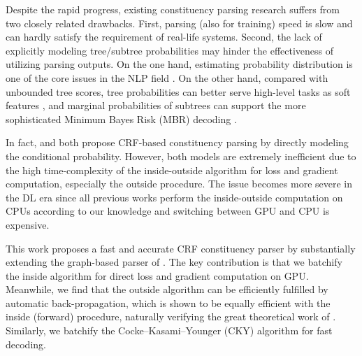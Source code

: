 Despite the rapid progress, existing constituency parsing research suffers from two closely related drawbacks. First, parsing (also for training) speed is slow and can hardly satisfy the requirement of %
real-life systems.
Second, the lack of explicitly modeling tree/subtree probabilities may hinder the effectiveness of utilizing parsing outputs.
On the one hand, estimating probability distribution is one of the core issues in the NLP field \cite{le-zuidema-2014-inside}. On the other hand, compared with unbounded tree scores, tree probabilities can better serve high-level tasks as soft features \cite{jin-etal-2020-relation},
and marginal probabilities of subtrees can support
the more sophisticated Minimum Bayes Risk (MBR) decoding \cite{smith-smith-2007-probabilistic}.

In fact, \cite{finkel-etal-2008-efficient} and \cite{durrett-klein-2015-neural} both propose CRF-based constituency parsing by directly modeling the conditional probability. %
However, both models are extremely inefficient due to
the high time-complexity of the inside-outside algorithm for loss and gradient computation, especially the outside procedure.
The issue becomes more severe in the DL era since all previous works perform the inside-outside computation on CPUs according to our knowledge and switching between GPU and CPU is expensive.


This work proposes a fast and accurate CRF constituency parser by substantially extending the graph-based parser of \cite{stern-etal-2017-minimal}. The key contribution is that we batchify the inside algorithm for direct loss and gradient computation on GPU. Meanwhile, we find that the outside algorithm can be efficiently fulfilled by automatic back-propagation, which is shown to be equally efficient with the inside (forward) procedure, naturally verifying the great theoretical work of \cite{eisner-2016-inside}.
Similarly, we batchify the Cocke–Kasami–Younger (CKY) algorithm for fast decoding.

